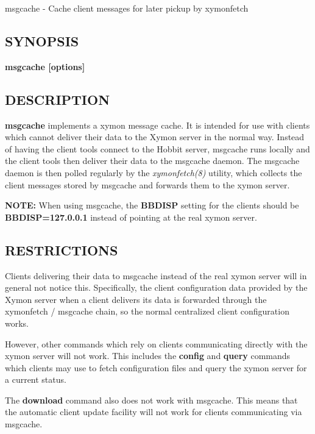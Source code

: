  msgcache - Cache client messages for later pickup by xymonfetch 

 
\subsection{SYNOPSIS}
\textbf{msgcache [options]}


 
\subsection{DESCRIPTION}
\textbf{msgcache}
 implements a xymon message cache. It is intended for use with clients which cannot deliver their data to the Xymon server in the normal way. Instead of having the client tools connect to the Hobbit server, msgcache runs locally and the client tools then deliver their data to the msgcache daemon. The msgcache daemon is then polled regularly by the \emph{xymonfetch(8)}
 utility, which collects the client messages stored by msgcache and forwards them to the xymon server. 

 \textbf{NOTE:}
 When using msgcache, the \textbf{BBDISP}
 setting for the clients should be \textbf{BBDISP=127.0.0.1}
 instead of pointing at the real xymon server. 


 
\subsection{RESTRICTIONS}
 Clients delivering their data to msgcache instead of the real xymon server will in general not notice this. Specifically, the client configuration data provided by the Xymon server when a client delivers its data is forwarded through the xymonfetch / msgcache chain, so the normal centralized client configuration works. 

  However, other commands which rely on clients communicating directly with the xymon server will not work. This includes the \textbf{config}
 and \textbf{query}
 commands which clients may use to fetch configuration files and query the xymon server for a current status. 


  The \textbf{download}
 command also does not work with msgcache. This means that the automatic client update facility will not work for clients communicating via msgcache. 


 
